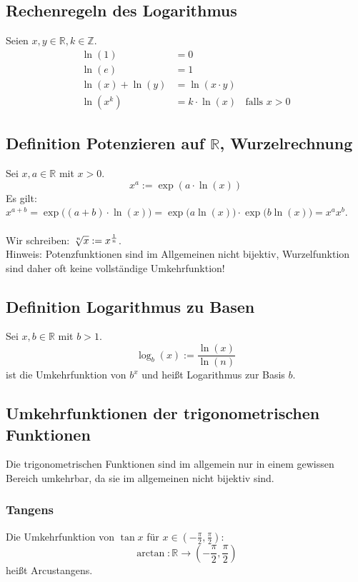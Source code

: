 \documentclass[halfparscip]{scrartcl}
\newcounter{subsection2}
\begin{document}
\subsection*{Rechenregeln des Logarithmus}
Seien $x,y \in \mathbb{R}, k \in \mathbb{Z}$.
\begin{align*}
	\ln(1) &= 0 \\
	\ln(e) &= 1 \\
	\ln(x) + \ln(y) &= \ln(x \cdot y)\\
	\ln(x^k) &= k \cdot \ln(x)\;\;\text{ falls }x > 0
\end{align*}

\subsection{Definition Potenzieren auf $\mathbb{R}$, Wurzelrechnung}
Sei $x,a \in \mathbb{R}$ mit $x > 0$.
\begin{equation*}
	x^a := \exp(a \cdot \ln(x))
\end{equation*}
Es gilt: $x^{a+b} = \exp\big((a+b) \cdot \ln(x)\big) = \exp\big(a \ln(x)\big)\cdot \exp\big(b \ln(x)\big) = x^ax^b$.\\\\
Wir schreiben: $\sqrt[\uproot{1}n]{x} := x^\frac{1}{n}$.\\
Hinweis: Potenzfunktionen sind im Allgemeinen nicht bijektiv, Wurzelfunktion sind daher oft keine vollständige Umkehrfunktion!

\subsection*{Definition Logarithmus zu Basen}
Sei $x, b \in \mathbb{R}$ mit $b > 1$.
\begin{equation*}
	\log_b(x) := \frac{\ln(x)}{\ln(n)}
\end{equation*}
ist die Umkehrfunktion von $b^x$ und heißt Logarithmus zur Basis $b$.

\subsection*{Umkehrfunktionen der trigonometrischen Funktionen}
Die trigonometrischen Funktionen sind im allgemein nur in einem gewissen Bereich umkehrbar, da sie im allgemeinen nicht bijektiv sind.
\subsubsection*{Tangens}
Die Umkehrfunktion von $\tan x$ für $x \in \left(-\frac{\pi}{2},\frac{\pi}{2}\right)$:
\begin{equation*}
	\arctan : \mathbb{R} \rightarrow \left(-\frac{\pi}{2},\frac{\pi}{2}\right)
\end{equation*}
heißt Arcustangens.
\end{document}
